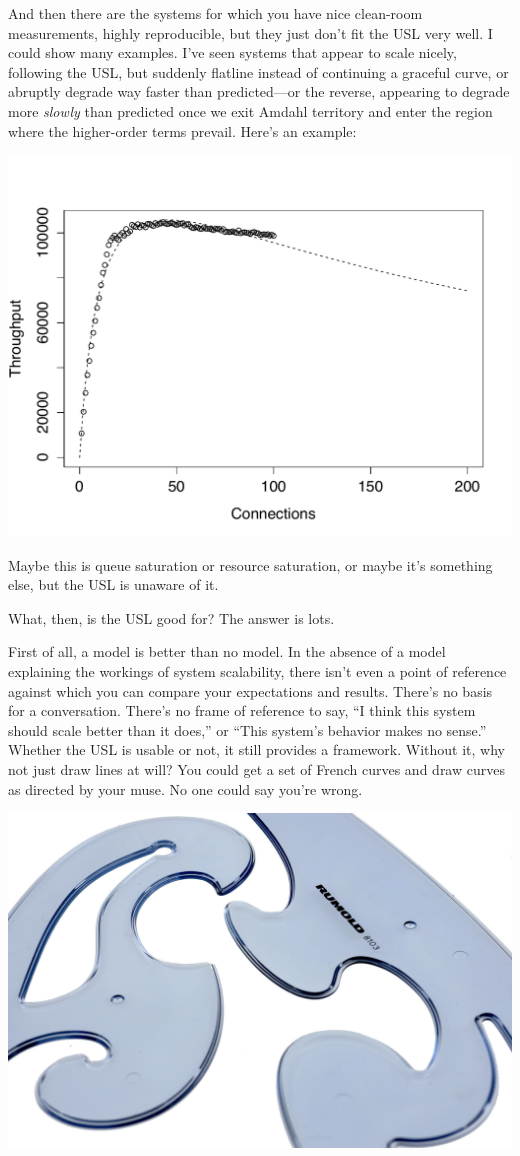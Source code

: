\documentclass{vivid_layout}
\begin{document}
And then there are the systems for which you have nice clean-room measurements,
highly reproducible, but they just don't fit the USL very well. I could show
many examples. I've seen systems that appear to scale nicely, following the USL,
but suddenly flatline instead of continuing a graceful curve, or abruptly
degrade way faster than predicted---or the reverse, appearing to degrade more
{\itshape slowly} than predicted once we exit Amdahl territory and enter the
region where the higher-order terms prevail.  Here's an example:
\begin{center}
\includegraphics[width=.85\linewidth]{scalability/handlersocket}
\end{center}

Maybe this is queue saturation or resource saturation, or maybe it's something
else, but the USL is unaware of it.

What, then, is the USL good for? The answer is lots.

First of all, a model is better than no model. In the absence of a model
explaining the workings of system scalability, there isn't even a point of
reference against which you can compare your expectations and results. There's
no basis for a conversation. There's no frame of reference to say, ``I think
this system should scale better than it does,'' or ``This system's behavior
makes no sense.'' Whether the USL is usable or not, it still provides a
framework. Without it, why not just draw lines at will? You
could get a set of French curves and draw curves as directed by your muse. No
one could say you're wrong.
\begin{center}
\includegraphics[width=.85\linewidth,trim={0 8cm 0 0},clip]{scalability/french_curve}
\end{center}
\end{document}

